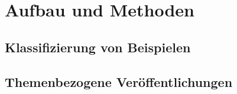 \chapter{Aufbau und Methoden}
\label{cha:stand_der_technik}

\section{Klassifizierung von Beispielen}
\label{sec:klassifizierung}

\section{Themenbezogene Veröffentlichungen}
\label{sec:themenbezogene_veroeffentlichungen}